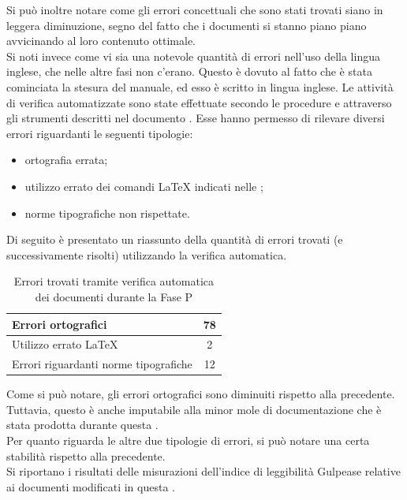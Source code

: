 				Si può inoltre notare come gli errori concettuali che sono stati trovati siano in leggera diminuzione, segno del fatto che i documenti si stanno piano piano avvicinando al loro contenuto ottimale.\\
				Si noti invece come vi sia una notevole quantità di errori nell'uso della lingua inglese, che nelle altre fasi non c'erano. Questo è dovuto al fatto che è stata cominciata la stesura del manuale, ed esso è scritto in lingua inglese.
				Le attività di verifica automatizzate sono state effettuate secondo le procedure e attraverso gli strumenti descritti nel documento . Esse hanno permesso di rilevare diversi errori riguardanti le seguenti tipologie:
				\begin{itemize}
					\item ortografia errata;
					\item utilizzo errato dei comandi \LaTeX{} indicati nelle ;
					\item norme tipografiche non rispettate.
				\end{itemize}
				Di seguito è presentato un riassunto della quantità di errori trovati (e successivamente risolti) utilizzando la verifica automatica.
				\begin{table}[H]
					\centering
						\begin{tabu}{| l | c |}
							\hline
							Errori ortografici	& 78	\\ \hline
							Utilizzo errato \LaTeX{}	& 2	\\ \hline
							Errori riguardanti norme tipografiche	& 12	\\ \hline
						\end{tabu}
					\caption{Errori trovati tramite verifica automatica dei documenti durante la Fase P}
				\end{table}
				Come si può notare, gli errori ortografici sono diminuiti rispetto alla  precedente. Tuttavia, questo è anche imputabile alla minor mole di documentazione che è stata prodotta durante questa .\\
				Per quanto riguarda le altre due tipologie di errori, si può notare una certa stabilità rispetto alla  precedente.\\
				Si riportano i risultati delle misurazioni dell'indice di leggibilità Gulpease relative ai documenti modificati in questa .
